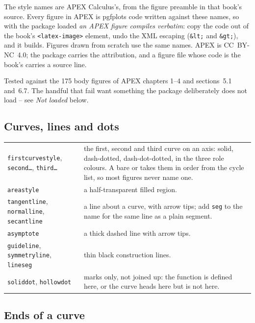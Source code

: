 The style names are APEX Calculus's, from the figure preamble in that
book's source. Every figure in APEX is pgfplots code written against these
names, so with the package loaded \emph{an APEX figure compiles verbatim}:
copy the code out of the book's \texttt{<latex-image>} element, undo the
XML escaping (\texttt{\&lt;} and \texttt{\&gt;}), and it builds. Figures
drawn from scratch use the same names. APEX is CC~BY-NC~4.0; the package
carries the attribution, and a figure file whose code is the book's carries
a source line.

Tested against the 175 body figures of APEX chapters 1--4 and
sections~5.1 and~6.7. The handful that fail want something the package
deliberately does not load -- see \emph{Not loaded} below.

\subsection*{Curves, lines and dots}

\begin{center}
\begin{tabularx}{\linewidth}{@{}l Y@{}}
\texttt{firstcurvestyle}, \texttt{second\ldots}, \texttt{third\ldots} &
  the first, second and third curve on an axis: solid, dash-dotted,
  dash-dot-dotted, in the three role colours. A bare  or
   takes them in order from the cycle list, so most figures
  never name one.\\
\texttt{areastyle} & a half-transparent filled region.\\
\texttt{tangentline}, \texttt{normalline}, \texttt{secantline} &
  a line about a curve, with arrow tips; add \texttt{seg} to the name for
  the same line as a plain segment.\\
\texttt{asymptote} & a thick dashed line with arrow tips.\\
\texttt{guideline}, \texttt{symmetryline}, \texttt{lineseg} &
  thin black construction lines.\\
\texttt{soliddot}, \texttt{hollowdot} & marks only, not joined up: the
  function is defined here, or the curve heads here but is not here.\\
\end{tabularx}
\end{center}

\subsection*{Ends of a curve}

